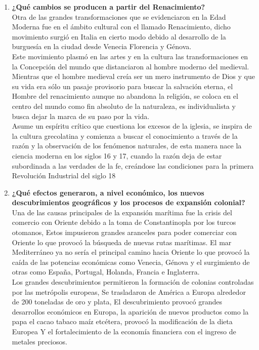 \documentclass[12pt]{book}
\begin{document}
\begin{enumerate}
\item \textbf{ ¿Qué cambios se producen a partir del Renacimiento?} \\
Otra de las grandes transformaciones que se evidenciaron en la Edad Moderna fue en el ámbito cultural con el llamado Renacimiento, dicho movimiento surgió en Italia en cierto modo debido al desarrollo de la burguesía en la ciudad desde Venecia Florencia y Génova.\\ 
Este movimiento plasmó en las artes y en la cultura las transformaciones en la Concepción del mundo que distanciaron al hombre moderno del medieval.\\
Mientras que el hombre medieval creía ser un mero instrumento de Dios y que su vida era sólo un pasaje provisorio para buscar la salvación eterna,  el Hombre del renacimiento aunque no abandona la religión, se coloca en el centro del mundo como fin absoluto de la naturaleza, es individualista y busca dejar la marca de su paso por la vida. \\
Asume un espíritu crítico que cuestiona los excesos de la iglesia, se inspira de la cultura grecolatina y comienza a buscar el conocimiento a través de la razón y la observación de los fenómenos naturales, de esta manera nace la ciencia moderna en los siglos 16 y 17, cuando la razón deja de estar subordinada a las verdades de la fe, creándose las condiciones para la primera Revolución Industrial del siglo 18 



\item \textbf{ ¿Qué efectos generaron, a nivel económico, los nuevos descubrimientos geográficos
y los procesos de expansión colonial?}
\\
Una de las causas principales de la expansión marítima fue la crisis del comercio con Oriente debido a la toma de Constantinopla por los turcos otomanos, Estos impusieron grandes aranceles para poder comerciar con Oriente lo que provocó la búsqueda de nuevas rutas marítimas.
El mar Mediterráneo ya no sería el principal camino hacia Oriente lo que provocó la caída de las potencias económicas como Venecia, Génova y el surgimiento de otras como España, Portugal, Holanda, Francia e Inglaterra.\\
Los grandes descubrimientos permitieron la formación de colonias controladas por las metrópolis europeas, Se trasladaron de América a Europa alrededor de 200 toneladas de oro y plata, El descubrimiento provocó grandes desarrollos económicos en Europa, la aparición de nuevos productos como la papa el cacao tabaco maíz etcétera,  provocó la modificación de la dieta Europea Y el fortalecimiento de la economía financiera con el ingreso de metales preciosos. 



\end{enumerate}
\end{document}
